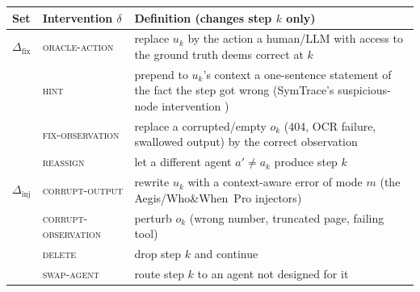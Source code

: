 \medskip\noindent\begin{minipage}{\linewidth}\centering\small
\begin{tabularx}{\linewidth}{@{}l l >{\RaggedRight}X@{}}\toprule
Set & Intervention $\delta$ & Definition (changes step $k$ only) \\\midrule
$\Delta_{\mathrm{fix}}$ & \textsc{oracle-action} & replace $u_k$ by the action a human/LLM with access to the ground truth deems correct at $k$ \\
 & \textsc{hint} & prepend to $u_k$'s context a one-sentence statement of the fact the step got wrong (SymTrace's suspicious-node intervention \cite{luan2026symtrace}) \\
 & \textsc{fix-observation} & replace a corrupted/empty $o_k$ (404, OCR failure, swallowed output) by the correct observation \\
 & \textsc{reassign} & let a different agent $a'\neq a_k$ produce step $k$ \\\midrule
$\Delta_{\mathrm{inj}}$ & \textsc{corrupt-output} & rewrite $u_k$ with a context-aware error of mode $m$ (the Aegis/Who\&When~Pro injectors) \\
 & \textsc{corrupt-observation} & perturb $o_k$ (wrong number, truncated page, failing tool) \\
 & \textsc{delete} & drop step $k$ and continue \\
 & \textsc{swap-agent} & route step $k$ to an agent not designed for it \\\bottomrule
\end{tabularx}
\label{tab:vocab}
\end{minipage}\medskip


